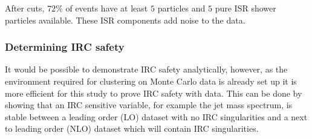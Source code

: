     After cuts, \(72\%\) of events have at least \(5\)  particles and \(5\) pure ISR shower particles available.
    These ISR components add noise to the data.

\subsubsection{Determining IRC safety}\label{sec:IRCmethod}
    It would be possible to demonstrate IRC safety analytically, however,
    as the environment required for clustering on Monte Carlo data is already set up
    it is more efficient for this study to prove IRC safety with data.
    This can be done by showing that an IRC sensitive variable, for example the jet mass spectrum,
    is stable between a leading order (LO) dataset with no IRC singularities and a next to leading order (NLO)
    dataset which will contain IRC singularities.


